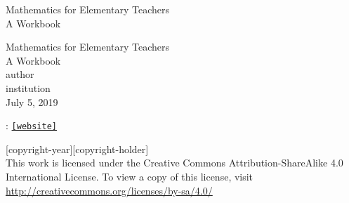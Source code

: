 \documentclass[twoside,11pt,]{book}
\newcommand{\mono}[1]{\texttt{#1}}
\begin{document}
\frontmatter
\thispagestyle{empty}
{\centering
\vspace*{0.28\textheight}
{\Huge Mathematics for Elementary Teachers}\\[2\baselineskip]
{\LARGE A Workbook}\\
}
\clearpage
\thispagestyle{empty}
\null%
\clearpage
\thispagestyle{empty}
{\centering
\vspace*{0.14\textheight}
{\Huge Mathematics for Elementary Teachers}\\[\baselineskip]
{\LARGE A Workbook}\\[3\baselineskip]
{\Large \textbraceleft{}author\textbraceright{}}\\[0.5\baselineskip]
{\Large \textbraceleft{}institution\textbraceright{}}\\[3\baselineskip]
{\Large July 5, 2019}\\}
\clearpage
\thispagestyle{empty}
\hypertarget{g:colophon:idm438877703264}{}
: \href{[website]}{\mono{[website]}}\par\medskip
\noindent\textcopyright{}[copyright-year]\quad{}[copyright-holder]\\[0.5\baselineskip]
 This work is licensed under the Creative Commons Attribution-ShareAlike 4.0 International License. To view a copy of this license, visit \href{http://creativecommons.org/licenses/by-sa/4.0/}{http:\slash{}\slash{}creativecommons.org\slash{}licenses\slash{}by-sa\slash{}4.0\slash{}}\par\medskip
{}
\null\clearpage
\setcounter{tocdepth}{2}
\renewcommand*\contentsname{Contents}
\tableofcontents
\mainmatter
%
%
\typeout{************************************************}
\typeout{************************************************}
%
\end{document}
